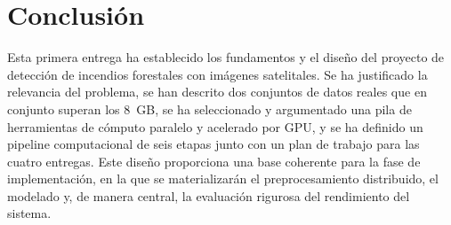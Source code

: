 \section{Conclusión}
\label{sec:conclusion}

Esta primera entrega ha establecido los fundamentos y el diseño del proyecto de detección de incendios forestales con imágenes satelitales. Se ha justificado la relevancia del problema, se han descrito dos conjuntos de datos reales que en conjunto superan los 8~GB, se ha seleccionado y argumentado una pila de herramientas de cómputo paralelo y acelerado por GPU, y se ha definido un pipeline computacional de seis etapas junto con un plan de trabajo para las cuatro entregas. Este diseño proporciona una base coherente para la fase de implementación, en la que se materializarán el preprocesamiento distribuido, el modelado y, de manera central, la evaluación rigurosa del rendimiento del sistema.

